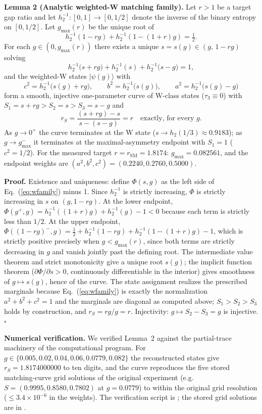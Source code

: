 \documentclass[11pt]{article}
\newcommand{\rSM}{r_{\mathrm{SM}}}
\begin{document}
\textbf{Lemma 2 (Analytic weighted-W matching family).}\label{lem:wfamily} Let $r > 1$ be a target gap ratio and let $h_2^{-1} : [0,1] \to [0, 1/2]$ denote the inverse of the binary entropy on $[0, 1/2]$. Let $g_{\max}(r)$ be the unique root of
\[
h_2^{-1}(1 - r g) + h_2^{-1}(1 - (1+r) g) = \tfrac{1}{2}.
\]
For each $g \in (0, g_{\max}(r))$ there exists a unique $s = s(g) \in (g,\, 1 - rg)$ solving
\begin{equation}
h_2^{-1}\big(s + r g\big) + h_2^{-1}(s) + h_2^{-1}\big(s - g\big) = 1,
\label{eq:wfamily}
\end{equation}
and the weighted-W states $|\psi(g)\rangle$ with
\[
c^2 = h_2^{-1}\big(s(g) + rg\big), \qquad b^2 = h_2^{-1}\big(s(g)\big), \qquad a^2 = h_2^{-1}\big(s(g) - g\big)
\]
form a smooth, injective one-parameter curve of W-class states ($\tau_3 \equiv 0$) with $S_1 = s + rg > S_2 = s > S_3 = s - g$ and
\[
r_S = \frac{(s + rg) - s}{s - (s - g)} = r \quad \text{exactly, for every } g.
\]
As $g \to 0^+$ the curve terminates at the W state ($s \to h_2(1/3) \approx 0.9183$); as $g \to g_{\max}^-$ it terminates at the maximal-asymmetry endpoint with $S_1 = 1$ ($c^2 = 1/2$). For the measured target $r = \rSM = 1.8174$: $g_{\max} = 0.082561$, and the endpoint weights are $(a^2, b^2, c^2) = (0.2240, 0.2760, 0.5000)$.

\textbf{Proof.} Existence and uniqueness: define $\Phi(s, g)$ as the left side of Eq.~(\ref{eq:wfamily}) minus 1. Since $h_2^{-1}$ is strictly increasing, $\Phi$ is strictly increasing in $s$ on $(g, 1 - rg)$. At the lower endpoint, $\Phi(g^+, g) = h_2^{-1}((1+r)g) + h_2^{-1}(g) - 1 < 0$ because each term is strictly less than $1/2$. At the upper endpoint, $\Phi((1 - rg)^-, g) = \tfrac12 + h_2^{-1}(1 - rg) + h_2^{-1}(1 - (1+r)g) - 1$, which is strictly positive precisely when $g < g_{\max}(r)$, since both terms are strictly decreasing in $g$ and vanish jointly past the defining root. The intermediate value theorem and strict monotonicity give a unique root $s(g)$; the implicit function theorem ($\partial\Phi/\partial s > 0$, continuously differentiable in the interior) gives smoothness of $g \mapsto s(g)$, hence of the curve. The state assignment realizes the prescribed marginals because Eq.~(\ref{eq:wfamily}) is exactly the normalization $a^2 + b^2 + c^2 = 1$ and the marginals are diagonal as computed above; $S_1 > S_2 > S_3$ holds by construction, and $r_S = rg/g = r$. Injectivity: $g \mapsto S_2 - S_3 = g$ is injective. \hfill$\square$

\textbf{Numerical verification.} We verified Lemma~2 against the partial-trace machinery of the computational program. For $g \in \{0.005, 0.02, 0.04, 0.06, 0.0779, 0.082\}$ the reconstructed states give $r_S = 1.8174000000$ to ten digits, and the curve reproduces the five stored matching-curve grid solutions of the original experiment (e.g.\ $S = (0.9995, 0.8580, 0.7802)$ at $g = 0.0779$) to within the original grid resolution ($\le 3.4 \times 10^{-6}$ in the weights). The verification script is ; the stored grid solutions are in .
\end{document}

